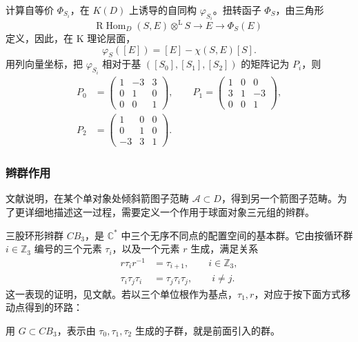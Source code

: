 计算自等价 $\Phi_{S_i}$，在 $K(D)$ 上诱导的自同构 $\varphi_{S_i}$。扭转函子 $\Phi_S$，由三角形
\[
\mathrm{R}\operatorname{Hom}_D(S,E)\otimes^{\mathrm L}S
\longrightarrow E\longrightarrow\Phi_S(E)
\]
定义，因此，在 K 理论层面，
\[
\varphi_S([E])=[E]-\chi(S,E)[S].
\]
用列向量坐标，把 $\varphi_{S_i}$ 相对于基 $([S_0],[S_1],[S_2])$ 的矩阵记为 $P_i$，则
\[
\begin{aligned}
P_0&=\begin{pmatrix}1&-3&3\\0&1&0\\0&0&1\end{pmatrix},\qquad
P_1=\begin{pmatrix}1&0&0\\3&1&-3\\0&0&1\end{pmatrix},\\
P_2&=\begin{pmatrix}1&0&0\\0&1&0\\-3&3&1\end{pmatrix}.
\end{aligned}
\]

\subsubsection{辫群作用}\label{sec:5.8.3.2}

文献说明，在某个单对象处倾斜箭图子范畴 $\mathcal{A}\subset D$，得到另一个箭图子范畴。为了更详细地描述这一过程，需要定义一个作用于球面对象三元组的辫群。

三股环形辫群 $CB_3$，是 $\mathbb{C}^*$ 中三个无序不同点的配置空间的基本群。它由按循环群 $i\in\mathbb{Z}_3$ 编号的三个元素 $\tau_i$，以及一个元素 $r$ 生成，满足关系
\[
\begin{aligned}
r\tau_i r^{-1}&=\tau_{i+1},\qquad i\in\mathbb{Z}_3,\\
\tau_i\tau_j\tau_i&=\tau_j\tau_i\tau_j,\qquad i\ne j.
\end{aligned}
\]
这一表现的证明，见文献。若以三个单位根作为基点，$\tau_1,r$，对应于按下面方式移动点得到的环路：
\begin{figure}[H]
\centering
{}
\end{figure}

用 $G\subset CB_3$，表示由 $\tau_0,\tau_1,\tau_2$ 生成的子群，就是前面引入的群。

